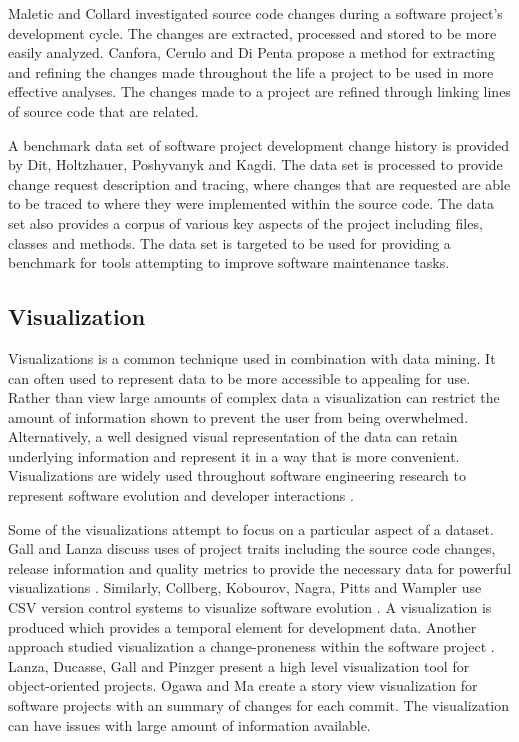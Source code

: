 Maletic and Collard investigated source code changes during a software project's development cycle\cite{Maletic2004}. The changes are extracted, processed and stored to be more easily analyzed. Canfora, Cerulo and Di Penta propose a method for extracting and refining the changes made throughout the life a project to be used in more effective analyses\cite{Canfora2007c}. The changes made to a project are refined through linking lines of source code that are related.

A benchmark data set of software project development change history is provided by Dit, Holtzhauer, Poshyvanyk and Kagdi\cite{Dit2013}. The data set is processed to provide change request description and tracing, where changes that are requested are able to be traced to where they were implemented within the source code. The data set also provides a corpus of various key aspects of the project including files, classes and methods. The data set is targeted to be used for providing a benchmark for tools attempting to improve software maintenance tasks.

\subsection{Visualization}

Visualizations is a common technique used in combination with data mining. It can often used to represent data to be more accessible to appealing for use. Rather than view large amounts of complex data a visualization can restrict the amount of information shown to prevent the user from being overwhelmed. Alternatively, a well designed visual representation of the data can retain underlying information and represent it in a way that is more convenient. Visualizations are widely used throughout software engineering research to represent software evolution \cite{Bieman2003a, Collberg2003, Gall2006, Keim2002, Ma2008, Salamanca2009} and developer interactions \cite{DeSouza2007, Gilbert2007, Ma2008, Ogawa2010, Salamanca2009}.

Some of the visualizations attempt to focus on a particular aspect of a dataset. Gall and Lanza discuss uses of project traits including the source code changes, release information and quality metrics to provide the necessary data for powerful visualizations \cite{Gall2006}. Similarly, Collberg, Kobourov, Nagra, Pitts and Wampler use CSV version control systems to visualize software evolution \cite{Collberg2003}. A visualization is produced which provides a temporal element for development data. Another approach studied visualization a change-proneness within the software project \cite{Bieman2003a}. Lanza, Ducasse, Gall and Pinzger present a high level visualization tool for object-oriented projects. %
Ogawa and Ma create a story view visualization for software projects with an summary of changes for each commit\cite{Ogawa2010}. The visualization can have issues with large amount of information available.

